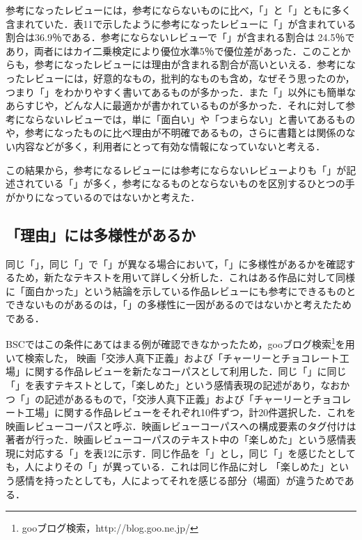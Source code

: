 \documentclass[japanese]{jnlp_1.3a}
\begin{document}
参考になったレビューには，参考にならないものに比べ，「」と「」ともに多く含まれていた．表11で示したように参考になったレビューに「」が含まれている割合は36.9{\kern0pt}％である．参考にならないレビューで「」が含まれる割合は 
24.5{\kern0pt}％であり，両者にはカイ二乗検定により優位水準5{\kern0pt}％で優位差があった．このことからも，参考になったレビューには理由が含まれる割合が高いといえる．参考になったレビューには，好意的なもの，批判的なものも含め，なぜそう思ったのか，つまり「」をわかりやすく書いてあるものが多かった．また「」以外にも簡単なあらすじや，どんな人に最適かが書かれているものが多かった．それに対して参考にならないレビューでは，単に「面白い」や「つまらない」と書いてあるものや，参考になったものに比べ理由が不明確であるもの，さらに書籍とは関係のない内容などが多く，利用者にとって有効な情報になっていないと考える．

\begin{table}[b]
\begin{center}

\end{center}
\end{table}

この結果から，参考になるレビューには参考にならないレビューよりも「」が記述されている「」が多く，参考になるものとならないものを区別するひとつの手がかりになっているのではないかと考えた．

\subsection{「理由」には多様性があるか}

同じ「」，同じ「」で「」が異なる場合において，「」に多様性があるかを確認するため，新たなテキストを用いて詳しく分析した．これはある作品に対して同様に「面白かった」という結論を示している作品レビューにも参考にできるものとできないものがあるのは，「」の多様性に一因があるのではないかと考えたためである．

\begin{table}[b]

\end{table}

BSCではこの条件にあてはまる例が確認できなかったため，gooブログ検索\footnote{
	gooブログ検索，http://blog.goo.ne.jp/}を用いて検索した，
映画「交渉人真下正義」および「チャーリーとチョコレート工場」に関する作品レビューを新たなコーパスとして利用した．同じ「」に同じ「」を表すテキストとして，「楽しめた」という感情表現の記述があり，なおかつ「」の記述があるもので，「交渉人真下正義」および「チャーリーとチョコレート工場」に関する作品レビューをそれぞれ10件ずつ，計20件選択した．これを映画レビューコーパスと呼ぶ．映画レビューコーパスへの構成要素のタグ付けは著者が行った．映画レビューコーパスのテキスト中の「楽しめた」という感情表現に対応する「」を表12に示す．同じ作品を「」とし，同じ「」を感じたとしても，人によりその「」が異っている．これは同じ作品に対し 
「楽しめた」という感情を持ったとしても，人によってそれを感じる部分（場面）が違うためである．
\end{document}
